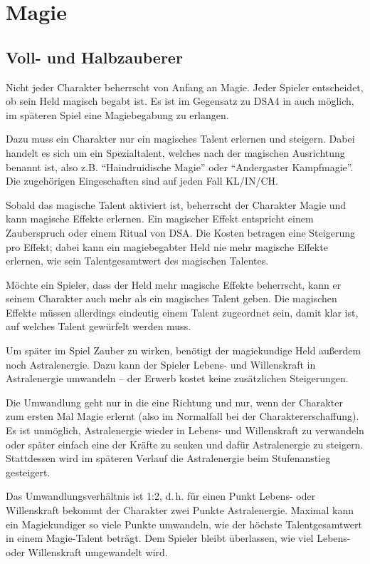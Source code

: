 \section{Magie}
\subsection{Voll- und Halbzauberer}

Nicht jeder Charakter beherrscht von Anfang an Magie. Jeder Spieler entscheidet, ob sein Held magisch begabt ist. Es ist im Gegensatz zu DSA4 in \StoryDSA auch möglich, im späteren Spiel eine Magiebegabung zu erlangen.

Dazu muss ein Charakter nur ein magisches Talent erlernen und steigern. Dabei handelt es sich um ein Spezialtalent, welches nach der magischen Ausrichtung benannt ist, also z.B. ``Haindruidische Magie'' oder ``Andergaster Kampfmagie''. Die zugehörigen Eingeschaften sind auf jeden Fall KL/IN/CH.

Sobald das magische Talent aktiviert ist, beherrscht der Charakter Magie und kann magische Effekte erlernen. Ein magischer Effekt entspricht einem Zauberspruch oder einem Ritual von DSA. Die Kosten betragen eine Steigerung pro Effekt; dabei kann ein magiebegabter Held nie mehr magische Effekte erlernen, wie sein Talentgesamtwert des magischen Talentes.

Möchte ein Spieler, dass der Held mehr magische Effekte beherrscht, kann er seinem Charakter auch mehr als ein magisches Talent geben. Die magischen Effekte müssen allerdings eindeutig einem Talent zugeordnet sein, damit klar ist, auf welches Talent gewürfelt werden muss.

Um später im Spiel Zauber zu wirken, benötigt der magiekundige Held außerdem noch Astralenergie. Dazu kann der Spieler Lebens- und Willenskraft in Astralenergie umwandeln -- der Erwerb kostet keine zusätzlichen Steigerungen.

Die Umwandlung geht nur in die eine Richtung und nur, wenn der Charakter zum ersten Mal Magie erlernt (also im Normalfall bei der Charaktererschaffung). Es ist unmöglich, Astralenergie wieder in Lebens- und Willenskraft zu verwandeln oder später einfach eine der Kräfte zu senken und dafür Astralenergie zu steigern. Stattdessen wird im späteren Verlauf die Astralenergie beim Stufenanstieg gesteigert.

Das Umwandlungsverhältnis ist 1:2, d.\,h. für einen Punkt Lebens- oder Willenskraft bekommt der Charakter zwei Punkte Astralenergie. Maximal kann ein Magiekundiger so viele Punkte umwandeln, wie der höchste Talentgesamtwert in einem Magie-Talent beträgt. Dem Spieler bleibt überlassen, wie viel Lebens- oder Willenskraft umgewandelt wird.

